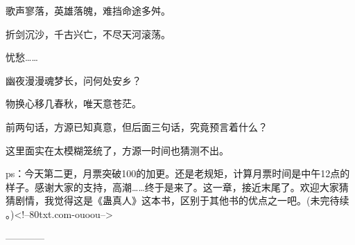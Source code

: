 \begin{this_body}
歌声寥落，英雄落魄，难挡命途多舛。

折剑沉沙，千古兴亡，不尽天河滚荡。

忧愁……

幽夜漫漫魂梦长，问何处安乡？

物换心移几春秋，唯天意苍茫。

前两句话，方源已知真意，但后面三句话，究竟预言着什么？

这里面实在太模糊笼统了，方源一时间也猜测不出。

ps：今天第二更，月票突破100的加更。还是老规矩，计算月票时间是中午12点的样子。感谢大家的支持，高潮……终于是来了。这一章，接近末尾了。欢迎大家猜猜剧情，我觉得这是《蛊真人》这本书，区别于其他书的优点之一吧。(未完待续 。)<!--80txt.com-ouoou-->

------------

\end{this_body}


